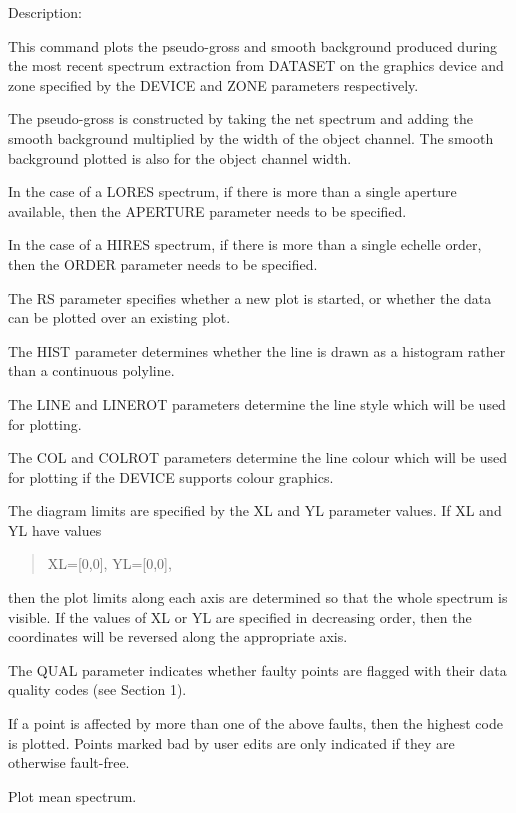\begin {description}
\begin {description}
\item Description:

This command plots the pseudo-gross and smooth background produced during
the most recent spectrum extraction from DATASET
on the graphics device and zone specified by the DEVICE and
ZONE parameters respectively.

The pseudo-gross is constructed by taking the net spectrum and adding
the smooth background multiplied by the width of the object channel.
The smooth background plotted is also for the object channel width.

In the case of a LORES spectrum, if there is more than a single
aperture available, then the APERTURE parameter needs to be specified.

In the case of a HIRES spectrum, if there is more than a single
echelle order, then the ORDER parameter needs to be specified.

The RS parameter specifies whether a new plot is started, or whether
the data can be plotted over an existing plot.

The HIST parameter determines whether the line is drawn as a histogram
rather than a continuous polyline.

The LINE and LINEROT parameters determine the line style which will be
used for plotting.

The COL and COLROT parameters determine the line colour which will be used
for plotting if the DEVICE supports colour graphics.

The diagram limits are specified by the XL and YL parameter values.
If XL and YL have values

\begin {quote}
XL=[0,0], YL=[0,0],
\end {quote}
then the plot limits along each axis are determined so that the whole
spectrum is visible.
If the values of XL or YL are specified in decreasing order, then
the coordinates will be reversed along the appropriate axis.

The QUAL parameter indicates whether faulty points are flagged with
their data quality codes (see Section 1).

If a point is affected by more than one of the above faults, then
the highest code is plotted.
Points marked bad by user edits are only indicated if they are otherwise
fault-free.
\end {description}

\item [PLMEAN]
Plot mean spectrum.


\end{description}
